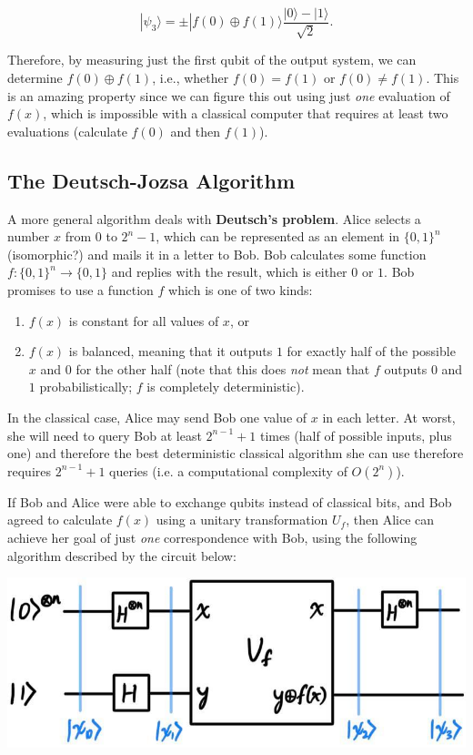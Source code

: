 \documentclass{article}
\theoremstyle{definition}
\begin{document}
      \[|\psi_3 \rangle = \pm |f(0) \oplus f(1) \rangle \frac{|0\rangle - |1\rangle}{\sqrt{2}}.\]

    Therefore, by measuring just the first qubit of the output system, we can determine $f(0) \oplus f(1)$, i.e., whether $f(0) = f(1)$ or $f(0) \neq f(1)$. This is an amazing property since we can figure this out using just \textit{one} evaluation of $f(x)$, which is impossible with a classical computer that requires at least two evaluations (calculate $f(0)$ and then $f(1)$).

  \subsection{The Deutsch-Jozsa Algorithm}

    A more general algorithm deals with \textbf{Deutsch's problem}. Alice selects a number $x$ from $0$ to $2^n - 1$, which can be represented as an element in $\{0, 1\}^n$ (isomorphic?) and mails it in a letter to Bob. Bob calculates some function $f: \{0, 1\}^n \longrightarrow \{0, 1\}$ and replies with the result, which is either $0$ or $1$. Bob promises to use a function $f$ which is one of two kinds: 

    \begin{enumerate}
      \item $f(x)$ is constant for all values of $x$, or

      \item $f(x)$ is balanced, meaning that it outputs $1$ for exactly half of the possible $x$ and $0$ for the other half (note that this does \textit{not} mean that $f$ outputs $0$ and $1$ probabilistically; $f$ is completely deterministic). 
    \end{enumerate}

    In the classical case, Alice may send Bob one value of $x$ in each letter. At worst, she will need to query Bob at least $2^{n-1} + 1$ times (half of possible inputs, plus one) and therefore the best deterministic classical algorithm she can use therefore requires $2^{n-1} + 1$ queries (i.e. a computational complexity of $O(2^n)$). 

    If Bob and Alice were able to exchange qubits instead of classical bits, and Bob agreed to calculate $f(x)$ using a unitary transformation $U_f$, then Alice can achieve her goal of just \textit{one} correspondence with Bob, using the following algorithm described by the circuit below: 

    \begin{center}
      \includegraphics[scale=0.3]{img/Deutsch_Jozsa_Algo.jpg}
    \end{center}
\end{document}
